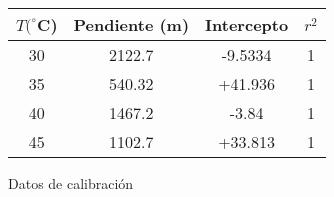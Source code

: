 \begin{figure}[H]
    \centering
\begin{tabular}{|c|c|c|c|}
\hline
$ T (^{\circ}$C) & Pendiente (m) & Intercepto & $r^{2}$ \\
\hline
30 & 2122.7 & -9.5334  & 1   \\
35 & 540.32 & +41.936  & 1   \\
40 & 1467.2 & -3.84    & 1   \\
45 & 1102.7 & +33.813  & 1   \\
\hline

\end{tabular} 
\caption{Datos  de calibración }
    \label{fig:my_label}
\end{figure}

